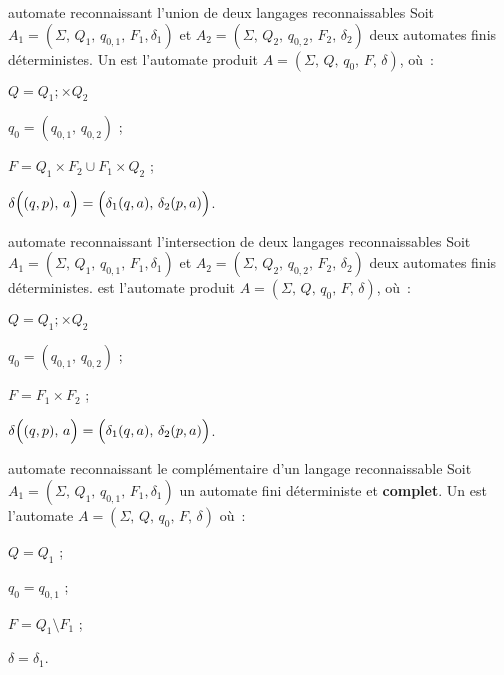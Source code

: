 \begin{adjustwidth}{-3cm}{-3cm}
\begin{definition}{2.19}{automate reconnaissant l'union de deux langages reconnaissables}
    Soit $A_1 = (\Sigma,\, Q_1,\, q_{0,1},\, F_1, \delta_1)$ et $A_2 = (\Sigma,\, Q_2,\, q_{0,2},\, F_2,\, \delta_2 )$ deux automates finis déterministes. Un  est l'automate produit $A = (\Sigma,\, Q,\, q_0,\, F,\, \delta)$, où~:
    \begin{enumeratebf}
        \item $Q = Q_1 ;\times Q_2 $
        \item $q_0 = (q_{0,1},\, q_{0,2})$ ;
        \item $F = Q_1 \times F_2 \cup F_1 \times Q_2$ ;
        \item $\delta\Bigl((q,p),\, a\Bigr) = \Bigl(\delta_1(q,a),\, \delta_2(p,a)\Bigr)$.
    \end{enumeratebf}
\end{definition}

\begin{definition}{2.20}{automate reconnaissant l'intersection de deux langages reconnaissables}
    Soit $A_1 = (\Sigma,\, Q_1,\, q_{0,1},\, F_1, \delta_1)$ et $A_2 = (\Sigma,\, Q_2,\, q_{0,2},\, F_2,\, \delta_2 )$ deux automates finis déterministes.  est l'automate produit $A = (\Sigma,\, Q,\, q_0,\, F,\, \delta)$, où~:
    \begin{enumeratebf}
        \item $Q = Q_1 ;\times Q_2 $
        \item $q_0 = (q_{0,1},\, q_{0,2})$ ;
        \item $F = F_1 \times F_2$ ;
        \item $\delta\Bigl((q,p),\, a\Bigr) = \Bigl(\delta_1(q,a),\, \delta_2(p,a)\Bigr)$.
    \end{enumeratebf}
\end{definition}

\begin{definition}{2.21}{automate reconnaissant le complémentaire d'un langage reconnaissable}
    Soit $A_1 = (\Sigma,\, Q_1,\, q_{0,1},\, F_1, \delta_1)$ un automate fini déterministe et \textbf{complet}. Un  est l'automate $A = (\Sigma,\, Q,\, q_0,\, F,\, \delta)$ où~:
    \begin{enumeratebf}
        \item $Q = Q_1$ ;
        \item $q_0 = q_{0,1}$ ;
        \item $F = Q_1 \setminus F_1$ ;
        \item $\delta = \delta_1$.
    \end{enumeratebf}
\end{definition}


\end{adjustwidth}

